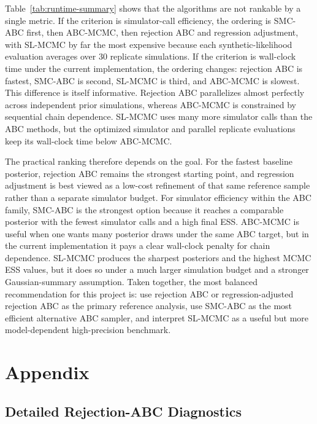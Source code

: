 \documentclass[11pt]{article}
\begin{document}
Table~\ref{tab:runtime-summary} shows that the algorithms are not rankable by a single metric. If the criterion is simulator-call efficiency, the ordering is SMC-ABC first, then ABC-MCMC, then rejection ABC and regression adjustment, with SL-MCMC by far the most expensive because each synthetic-likelihood evaluation averages over $30$ replicate simulations. If the criterion is wall-clock time under the current implementation, the ordering changes: rejection ABC is fastest, SMC-ABC is second, SL-MCMC is third, and ABC-MCMC is slowest. This difference is itself informative. Rejection ABC parallelizes almost perfectly across independent prior simulations, whereas ABC-MCMC is constrained by sequential chain dependence. SL-MCMC uses many more simulator calls than the ABC methods, but the optimized simulator and parallel replicate evaluations keep its wall-clock time below ABC-MCMC.

The practical ranking therefore depends on the goal. For the fastest baseline posterior, rejection ABC remains the strongest starting point, and regression adjustment is best viewed as a low-cost refinement of that same reference sample rather than a separate simulator budget. For simulator efficiency within the ABC family, SMC-ABC is the strongest option because it reaches a comparable posterior with the fewest simulator calls and a high final ESS. ABC-MCMC is useful when one wants many posterior draws under the same ABC target, but in the current implementation it pays a clear wall-clock penalty for chain dependence. SL-MCMC produces the sharpest posteriors and the highest MCMC ESS values, but it does so under a much larger simulation budget and a stronger Gaussian-summary assumption. Taken together, the most balanced recommendation for this project is: use rejection ABC or regression-adjusted rejection ABC as the primary reference analysis, use SMC-ABC as the most efficient alternative ABC sampler, and interpret SL-MCMC as a useful but more model-dependent high-precision benchmark.

\appendix
\renewcommand{\thesection}{Appendix \Alph{section}}
\renewcommand{\thesubsection}{\Alph{section}.\arabic{subsection}}
\addcontentsline{toc}{section}{\thesection}
\section*{\thesection}
\label{app:supporting-material}

\subsection{Detailed Rejection-ABC Diagnostics}
\label{app:rejection-diagnostics}
\end{document}
